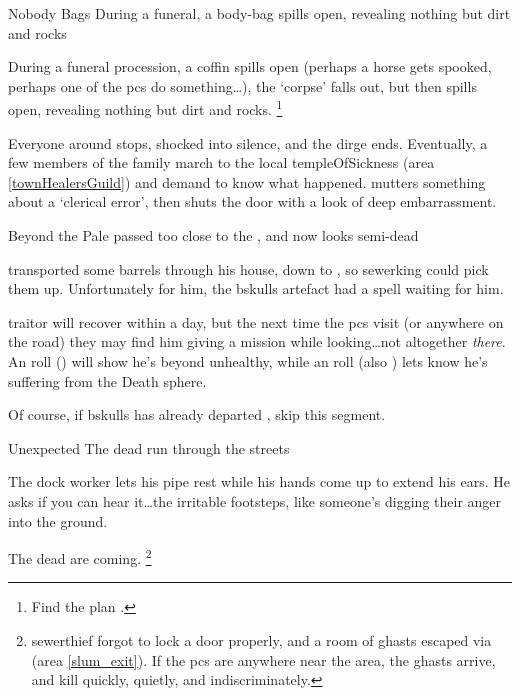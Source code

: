   {Nobody Bags}%
  {During a funeral, a body-bag spills open, revealing nothing but dirt and rocks}%
  \label{sewerPt2}

During a funeral procession, a coffin spills open (perhaps a horse gets spooked, perhaps one of the \glspl{pc} do something\ldots), the `corpse' falls out, but then spills open, revealing nothing but dirt and rocks.%
\footnote{Find the plan .}

Everyone around stops, shocked into silence, and the dirge ends.
Eventually, a few members of the family march to the local \gls{templeOfSickness} (area \vref{townHealersGuild}) and demand to know what happened.
 mutters something about a `clerical error', then shuts the door with a look of deep embarrassment.

  {Beyond the Pale}%
  { passed too close to the , and now looks semi-dead}%

\begin{exampletext}
   transported some barrels through his house, down to , so \gls{sewerking} could pick them up.
  Unfortunately for him, the \gls{bskulls} \gls{artefact} had a spell waiting for him.
\end{exampletext}

\Gls{traitor} will recover within a day, but the next time the \glspl{pc} visit  (or anywhere on the road) they may find him giving a mission while looking\ldots not altogether \textit{there}.
An  roll (\tn[8]) will show he's beyond unhealthy, while an  roll (also \tn[8]) lets  know he's suffering from the Death \gls{sphere}.

Of course, if \gls{bskulls} has already departed , skip this \gls{segment}.

{Unexpected }%
{The dead run through the streets}%

\begin{boxtext}
  The dock worker lets his pipe rest while his hands come up to extend his ears.
  He asks if you can hear it\ldots the irritable footsteps, like someone's digging their anger into the ground.
\end{boxtext}

The dead are coming.%
\footnote{\Gls{sewerthief} forgot to lock a door properly, and a room of \glspl{ghast} escaped via  (area \vref{slum_exit}).
If the \glspl{pc} are anywhere near the area, the \glspl{ghast} arrive, and kill quickly, quietly, and indiscriminately.}

